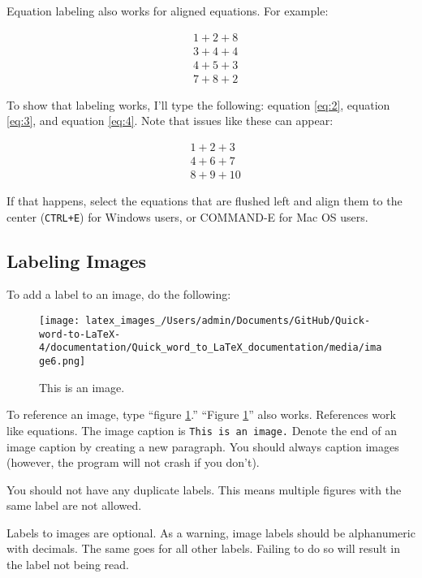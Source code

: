 \documentclass[12pt]{article}
\theoremstyle{plain}
\theoremstyle{remark}
\theoremstyle{definition}
\begin{document}
Equation labeling also works for aligned equations. For example:

\begin{align*}
&1 + 2 + 8\tag{2} \label{eq:2} \\
&3 + 4 + 4\tag{3} \label{eq:3} \\
&4 + 5 + 3
 \\
&7 + 8 + 2\tag{4} \label{eq:4}
\end{align*}


To show that labeling works, I'll type the following: equation \ref{eq:2},
equation \ref{eq:3}, and equation \ref{eq:4}. Note that issues like these can appear:

\begin{align*}
&1 + 2 + 3\tag{5} \label{eq:5} \\
&4 + 6 + 7
 \\
&8 + 9 + 10\tag{6} \label{eq:6}
\end{align*}


If that happens, select the equations that are flushed left and align
them to the center (\texttt{CTRL+E}) for Windows users, or COMMAND-E for
Mac OS users.


\subsection{Labeling Images}

To add a label to an image, do the following:


\begin{figure}[H]
\centering
\texttt{[image: latex\_images\_/Users/admin/Documents/GitHub/Quick-word-to-LaTeX-4/documentation/Quick\_word\_to\_LaTeX\_documentation/media/image6.png]}
\caption{This is an image.}
\label{fig:p1}

\end{figure}



To reference an image, type ``figure \ref{fig:p1}.'' ``Figure \ref{fig:p1}'' also works.
References work like equations. The image caption is
\texttt{This\ is\ an\ image.} Denote the end of an image caption by
creating a new paragraph. You should always caption images (however, the
program will not crash if you don't).

You should not have any duplicate labels. This means multiple figures
with the same label are not allowed.

Labels to images are optional. As a warning, image labels should be
alphanumeric with decimals. The same goes for all other labels. Failing
to do so will result in the label not being read.
\end{document}
